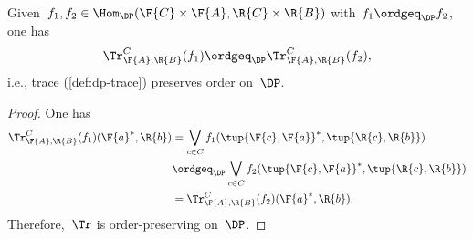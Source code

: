 \begin{lemma}
Given~$f_1,f_2\in \Hom_\DP(\F{C}\times \F{A},\R{C}\times \R{B})$ with~$f_1\ordgeq_\DP f_2$, one has
\begin{equation}
    \Tr_{\F{A},\R{B}}^C(f_1)\ordgeq_\DP \Tr_{\F{A},\R{B}}^C(f_2),
\end{equation}
i.e., trace (\cref{def:dp-trace}) preserves order on~$\DP$.
\end{lemma}

\begin{proof}
One has
\begin{equation}
    \begin{aligned}
    \Tr_{\F{A},\R{B}}^C(f_1)(\F{a}^*,\R{b})&=\bigvee_{c\in C}f_1(\tup{\F{c},\F{a}}^*,\tup{\R{c},\R{b}})\\
    &\ordgeq_\DP \bigvee_{c\in C}f_2(\tup{\F{c},\F{a}}^*,\tup{\R{c},\R{b}})\\
    &=\Tr_{\F{A},\R{B}}^C(f_2)(\F{a}^*,\R{b}).
    \end{aligned}
\end{equation}
Therefore,~$\Tr$ is order-preserving on~$\DP$.
\end{proof}
